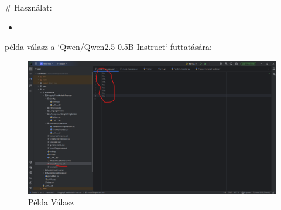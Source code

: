 \begin{Document}
                         # Használat:
                         \begin{itemize}
                             \item
                         \end{itemize}
                         példa válasz a `Qwen/Qwen2.5-0.5B-Instruct` futtatására:
                         \begin{figure}
                             \centering
                             \includegraphics[keepaspectratio]{pelda}
                             \caption{Példa Válasz}
                             \label{fig:PeldaValasz}
                         \end{figure}


\end{Document}
